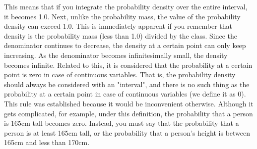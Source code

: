 \documentclass{ltjbook}
\begin{document}
This means that if you integrate the probability density over the entire interval, it becomes 1.0. Next, unlike the probability mass, the value of the probability density can exceed 1.0. This is immediately apparent if you remember that density is the probability mass (less than 1.0) divided by the class. Since the denominator continues to decrease, the density at a certain point can only keep increasing. As the denominator becomes infinitesimally small, the density becomes infinite. Related to this, it is considered that the probability at a certain point is zero in case of continuous variables. That is, the probability density should always be considered with an "interval", and there is no such thing as the probability at a certain point in case of continuous variables (we define it as 0). This rule was established because it would be inconvenient otherwise. Although it gets complicated, for example, under this definition, the probability that a person is 165cm tall becomes zero. Instead, you must say that the probability that a person is at least 165cm tall, or the probability that a person's height is between 165cm and less than 170cm.

\end{document}
